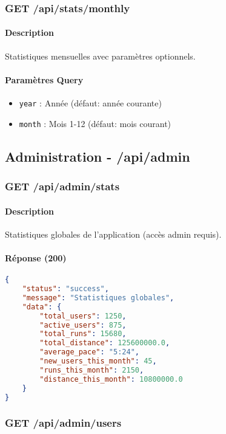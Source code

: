 \subsubsection{GET /api/stats/monthly}

\paragraph{Description}
Statistiques mensuelles avec paramètres optionnels.

\paragraph{Paramètres Query}
\begin{itemize}
    \item \texttt{year} : Année (défaut: année courante)
    \item \texttt{month} : Mois 1-12 (défaut: mois courant)
\end{itemize}

\subsection{Administration - /api/admin}

\subsubsection{GET /api/admin/stats}

\paragraph{Description}
Statistiques globales de l'application (accès admin requis).

\paragraph{Réponse (200)}
\begin{lstlisting}[language=json]
{
    "status": "success",
    "message": "Statistiques globales",
    "data": {
        "total_users": 1250,
        "active_users": 875,
        "total_runs": 15680,
        "total_distance": 125600000.0,
        "average_pace": "5:24",
        "new_users_this_month": 45,
        "runs_this_month": 2150,
        "distance_this_month": 10800000.0
    }
}
\end{lstlisting}

\subsubsection{GET /api/admin/users}

